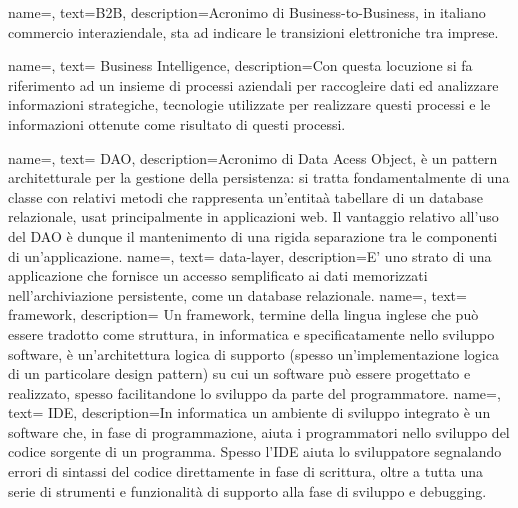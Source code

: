 
\renewcommand{\acronymname}{Acronimi e abbreviazioni}








{
    name=,
    text=B2B,
    description={Acronimo di Business-to-Business, in italiano commercio interaziendale, sta ad indicare le transizioni elettroniche tra imprese.}
}

{
    name=,
    text= Business Intelligence,
    description={Con questa locuzione si fa riferimento ad un insieme di processi aziendali per raccogleire dati ed analizzare informazioni strategiche, tecnologie utilizzate per realizzare questi processi e le informazioni ottenute come risultato di questi processi.}
}

{
    name=,
    text= DAO,
    description={Acronimo di Data Acess Object, è un pattern architetturale per la gestione della persistenza: si tratta fondamentalmente di una classe con relativi metodi che rappresenta un'entitaà tabellare di un database relazionale, usat principalmente in applicazioni web. Il vantaggio relativo all'uso del DAO è dunque il mantenimento di una rigida separazione tra le componenti di un'applicazione.}
}
{
    name=,
    text= data-layer,
    description={E' uno strato di una applicazione che fornisce un accesso semplificato ai dati memorizzati nell'archiviazione persistente, come un database relazionale.}
}
{
    name=,
    text= framework,
    description={ Un framework, termine della lingua inglese che può essere tradotto come struttura, in informatica e specificatamente nello sviluppo software, è un'architettura logica di supporto (spesso un'implementazione logica di un particolare design pattern) su cui un software può essere progettato e realizzato, spesso facilitandone lo sviluppo da parte del programmatore.}
}
{
    name=,
    text= IDE,
    description={In informatica un ambiente di sviluppo integrato è un software che, in fase di programmazione, aiuta i programmatori nello sviluppo del codice sorgente di un programma. Spesso l'IDE aiuta lo sviluppatore segnalando errori di sintassi del codice direttamente in fase di scrittura, oltre a tutta una serie di strumenti e funzionalità di supporto alla fase di sviluppo e debugging.}
}

